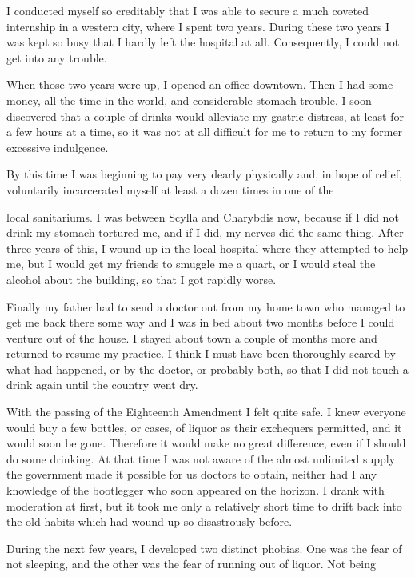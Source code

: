 \begin{biblechapter}
I conducted myself so creditably that I was able to secure a much coveted internship in a western city, where I spent two years. During these two years I was kept so busy that I hardly left the hospital at all. Consequently, I could not get into any trouble.

When those two years were up, I opened an office downtown. Then I had some money, all the time in the world, and considerable stomach trouble. I soon discovered that a couple of drinks would alleviate my gastric distress, at least for a few hours at a time, so it was not at all difficult for me to return to my former excessive indulgence.

By this time I was beginning to pay very dearly physically and, in hope of relief, voluntarily incarcerated myself at least a dozen times in one of the

local sanitariums. I was between Scylla and Charybdis now, because if I did not drink my stomach tortured me, and if I did, my nerves did the same thing. After three years of this, I wound up in the local hospital where they attempted to help me, but I would get my friends to smuggle me a quart, or I would steal the alcohol about the building, so that I got rapidly worse.

Finally my father had to send a doctor out from my home town who managed to get me back there some way and I was in bed about two months before I could venture out of the house. I stayed about town a couple of months more and returned to resume my practice. I think I must have been thoroughly scared by what had happened, or by the doctor, or probably both, so that I did not touch a drink again until the country went dry.

With the passing of the Eighteenth Amendment I felt quite safe. I knew everyone would buy a few bottles, or cases, of liquor as their exchequers permitted, and it would soon be gone. Therefore it would make no great difference, even if I should do some drinking. At that time I was not aware of the almost unlimited supply the government made it possible for us doctors to obtain, neither had I any knowledge of the bootlegger who soon appeared on the horizon. I drank with moderation at first, but it took me only a relatively short time to drift back into the old habits which had wound up so disastrously before.

During the next few years, I developed two distinct phobias. One was the fear of not sleeping, and the other was the fear of running out of liquor. Not being


\end{biblechapter}
